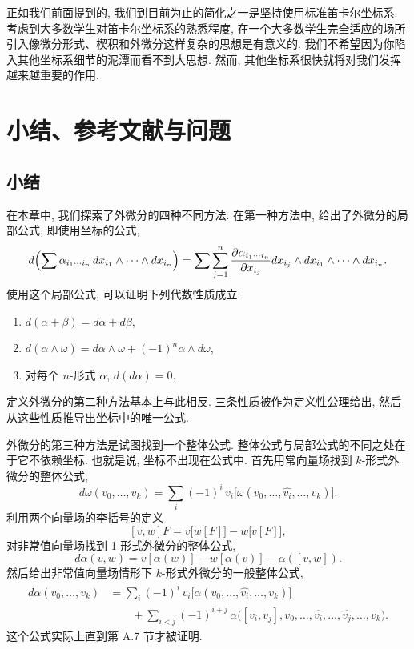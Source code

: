 正如我们前面提到的, 我们到目前为止的简化之一是坚持使用标准笛卡尔坐标系. 考虑到大多数学生对笛卡尔坐标系的熟悉程度, 在一个大多数学生完全适应的场所引入像微分形式、楔积和外微分这样复杂的思想是有意义的. 我们不希望因为你陷入其他坐标系细节的泥潭而看不到大思想. 然而, 其他坐标系很快就将对我们发挥越来越重要的作用.

\section{小结、参考文献与问题}

\subsection{小结}

在本章中, 我们探索了外微分的四种不同方法. 在第一种方法中, 给出了外微分的局部公式, 即使用坐标的公式, 
\[
d\Bigl(\sum \alpha_{i_1\cdots i_n}\,dx_{i_1}\wedge\cdots\wedge dx_{i_n}\Bigr)
=\sum\sum_{j=1}^{n}\frac{\partial\alpha_{i_1\cdots i_n}}{\partial x_{i_j}}dx_{i_j}\wedge dx_{i_1}\wedge\cdots\wedge dx_{i_n}.
\]
使用这个局部公式, 可以证明下列代数性质成立: 
\begin{enumerate}
  \item $d(\alpha+\beta)=d\alpha+d\beta$, 
  \item $d(\alpha\wedge\omega)=d\alpha\wedge\omega+(-1)^n\alpha\wedge d\omega$, 
  \item 对每个 $n$-形式 $\alpha$, $d(d\alpha)=0$.
\end{enumerate}
定义外微分的第二种方法基本上与此相反. 三条性质被作为定义性公理给出, 然后从这些性质推导出坐标中的唯一公式.

外微分的第三种方法是试图找到一个整体公式. 整体公式与局部公式的不同之处在于它不依赖坐标. 也就是说, 坐标不出现在公式中. 首先用常向量场找到 $k$-形式外微分的整体公式, 
\[
d\omega(v_0,\ldots,v_k)=\sum_i(-1)^i\,v_i\bigl[\omega(v_0,\ldots,\widehat{v_i},\ldots,v_k)\bigr].
\]
利用两个向量场的李括号的定义
\[
[v,w]F=v\bigl[w[F]\bigr]-w\bigl[v[F]\bigr],
\]
对非常值向量场找到 1-形式外微分的整体公式, 
\[
d\alpha(v,w)=v[\alpha(w)]-w[\alpha(v)]-\alpha([v,w]).
\]
然后给出非常值向量场情形下 $k$-形式外微分的一般整体公式, 
\[
\begin{aligned}
d\alpha(v_0,\ldots,v_k)&=\sum_i(-1)^i\,v_i\bigl[\alpha(v_0,\ldots,\widehat{v_i},\ldots,v_k)\bigr]\\
&\qquad+\sum_{i<j}(-1)^{i+j}\,\alpha\bigl([v_i,v_j],v_0,\ldots,\widehat{v_i},\ldots,\widehat{v_j},\ldots,v_k\bigr).
\end{aligned}
\]
这个公式实际上直到第 A.7 节才被证明.


